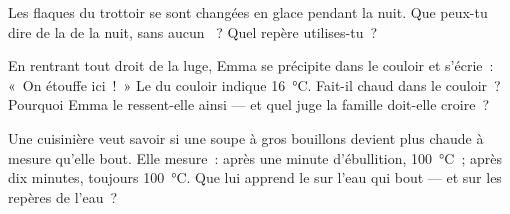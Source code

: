 \begin{exercise}[$\star$]\label{exo:g3:temperature-thermometers:9}
Les flaques du trottoir se sont changées en glace pendant la nuit.
Que peux-tu dire de la  de la nuit, sans aucun
~? Quel repère utilises-tu~?
\end{exercise}

\begin{exercise}[$\star\star$]\label{exo:g3:temperature-thermometers:10}
En rentrant tout droit de la luge, Emma se précipite dans le couloir
et s'écrie~: «~On étouffe ici~!~» Le  du couloir indique
\qty{16}{\celsius}. Fait-il chaud dans le couloir~? Pourquoi Emma
le ressent-elle ainsi --- et quel juge la famille doit-elle croire~?
\end{exercise}

\begin{exercise}[$\star\star$]\label{exo:g3:temperature-thermometers:11}
Une cuisinière veut savoir si une soupe à gros bouillons devient plus
chaude à mesure qu'elle bout. Elle mesure~: après une minute
d'ébullition, \qty{100}{\celsius}~; après dix minutes, toujours
\qty{100}{\celsius}. Que lui apprend le  sur l'eau qui
bout --- et sur les repères de l'eau~?
\end{exercise}
